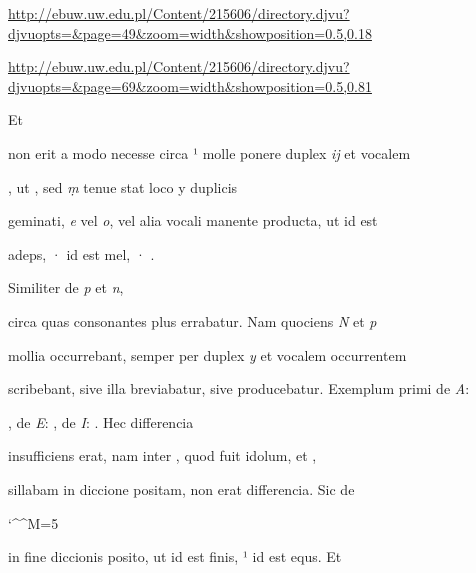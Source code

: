 
\newParkoszpage


{
\url{http://ebuw.uw.edu.pl/Content/215606/directory.djvu?djvuopts=&page=49&zoom=width&showposition=0.5,0.18}

\url{http://ebuw.uw.edu.pl/Content/215606/directory.djvu?djvuopts=&page=69&zoom=width&showposition=0.5,0.81}
}


\fullpreviouslines


{
\color{blue}
Et

}


\fulllines
{}
non erit a modo necesse circa ¹ molle ponere duplex \textit{ij} et vocalem 

, ut  , sed \textit{ṃ} tenue stat loco y duplicis

geminati, \textit{e} vel \textit{o}, vel alia vocali manente producta, ut  id est

\splitlines
adeps, ·  id est mel, · .

\indentK Similiter de \textit{p} et \textit{n},

\fulllines
circa quas consonantes plus errabatur. Nam quociens \textit{N} et \textit{p}

mollia occurrebant, semper per duplex \textit{y} et vocalem occurrentem

scribebant, sive illa breviabatur, sive producebatur. Exemplum primi de \textit{A}:

, de \textit{E}: , de \textit{I}: . Hec differencia

insufficiens erat, nam inter , quod fuit idolum, et ,

sillabam in diccione  positam, non erat differencia. Sic de

\catcode `\^^M=5


\obeylines

 in fine diccionis posito, ut  id est finis, ¹ id est equs. Et

